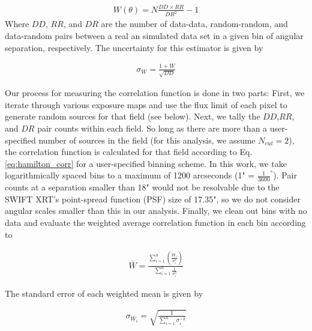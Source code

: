 \documentclass[preprint]{aastex63}
\begin{document}
\begin{align}
    \label{eq:hamilton_corr}
    W(\theta) = N \frac{DD \times RR}{DR^2}-1
\end{align}
Where $DD$, $RR$, and $DR$ are the number of data-data, random-random, and data-random pairs between a real an simulated data set
in a given bin of angular separation, respectively. The uncertainty for this estimator is given by

\begin{align}
    \label{eq:hamilton_sig}
    \sigma_W = \frac{1+W}{\sqrt{DD}}
\end{align}

Our process for measuring the correlation function is done in two parts: First, we
iterate through various exposure maps and use the flux limit of each pixel to generate random
sources for that field (see below). Next, we tally the  $DD$,$RR$, and $DR$ pair counts within each field. So long as there are more than a user-specified
number of sources in the field (for this analysis, we assume $N_{cut} =2$), the correlation function is calculated 
for that field according to Eq.\ref{eq:hamilton_corr} for a user-specified binning scheme. In this work, 
we take logarithmically spaced bins to a maximum of 1200 arcseconds (1" = $\frac{1}{3600}^\circ$). Pair counts at a separation smaller than 18" would 
not be resolvable due to the SWIFT XRT's point-spread function (PSF) size of 17.35", so we do not consider angular scales smaller than this in
our analysis. Finally, we clean out bins with no data and evaluate
the weighted average correlation function in each bin according to 

\begin{align}
    \label{eq:weight_avg}
    \bar W = \frac{\sum_{i=1}^n\left(\frac{W_i}{\sigma^2_i}\right)}{\sum_{i=1}^{n}\frac{1}{\sigma_i^2}}
\end{align}

The standard error of each weighted mean is given by 

\begin{align}
    \label{eq:weight_err}
     \sigma_{\bar W_i} = \sqrt{\frac{1}{\sum_{i=1}^{n}\sigma_i^{-2}}}
\end{align}
\end{document}
